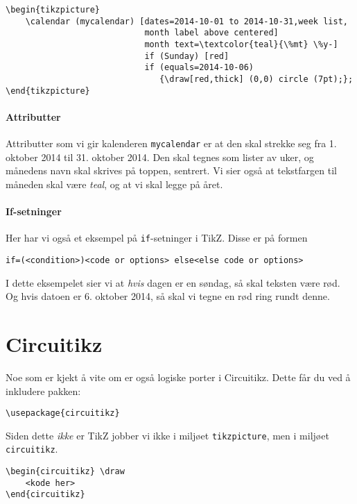 \documentclass[11pt, a4paper]{article}
\begin{document}
\begin{Verbatim}[fontsize=\footnotesize, frame=single]
\begin{tikzpicture}
    \calendar (mycalendar) [dates=2014-10-01 to 2014-10-31,week list, 
                            month label above centered]
                            month text=\textcolor{teal}{\%mt} \%y-] 
                            if (Sunday) [red]
                            if (equals=2014-10-06) 
                               {\draw[red,thick] (0,0) circle (7pt);};
\end{tikzpicture}
\end{Verbatim}

\paragraph{Attributter} Attributter som vi gir kalenderen \texttt{mycalendar} er at den skal strekke seg fra 1. oktober 2014 til 31. oktober 2014. Den skal tegnes som lister av uker, og månedens navn skal skrives på toppen, sentrert. Vi sier også at tekstfargen til måneden skal være \textit{teal}, og at vi skal legge på året.

\paragraph{If-setninger} Her har vi også et eksempel på \texttt{if}-setninger i TikZ. Disse er på formen
\begin{Verbatim}[fontsize=\footnotesize, frame=single]
if=(<condition>)<code or options> else<else code or options>
\end{Verbatim}

I dette eksempelet sier vi at \textit{hvis} dagen er en søndag, så skal teksten være rød. Og hvis datoen er 6. oktober 2014, så skal vi tegne en rød ring rundt denne.


\newpage

\section{Circuitikz}
Noe som er kjekt å vite om er også logiske porter i Circuitikz. Dette får du ved å inkludere pakken:
\begin{Verbatim}[fontsize=\small]
\usepackage{circuitikz}
\end{Verbatim}
Siden dette \textit{ikke} er TikZ jobber vi ikke i miljøet \texttt{tikzpicture}, men i miljøet \texttt{circuitikz}.

\begin{Verbatim}[fontsize=\small, frame=single]
\begin{circuitikz} \draw
    <kode her>
\end{circuitikz}
\end{Verbatim}
\end{document}

